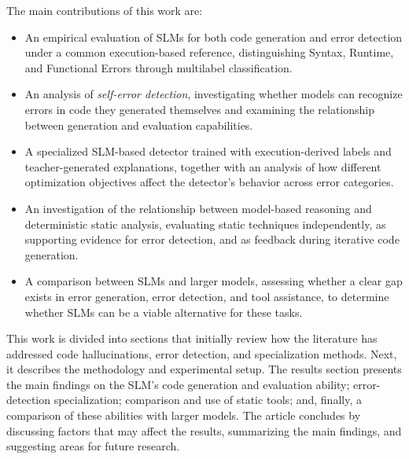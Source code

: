 The main contributions of this work are:

\begin{itemize}

    \item An empirical evaluation of SLMs for both code generation and error detection under a common execution-based reference, distinguishing Syntax, Runtime, and Functional Errors through multilabel classification.

    \item An analysis of \emph{self-error detection}, investigating whether models can recognize errors in code they generated themselves and examining the relationship between generation and evaluation capabilities.

    \item A specialized SLM-based detector trained with execution-derived labels and teacher-generated explanations, together with an analysis of how different optimization objectives affect the detector's behavior across error categories.

    \item An investigation of the relationship between model-based reasoning and deterministic static analysis, evaluating static techniques independently, as supporting evidence for error detection, and as feedback during iterative code generation.

    \item A comparison between SLMs and larger models, assessing whether a clear gap exists in error generation, error detection, and tool assistance, to determine whether SLMs can be a viable alternative for these tasks.

\end{itemize}

This work is divided into sections that initially review how the literature has addressed code hallucinations, error detection, and specialization methods. Next, it describes the methodology and experimental setup. The results section presents the main findings on the SLM's code generation and evaluation ability; error-detection specialization; comparison and use of static tools; and, finally, a comparison of these abilities with larger models. The article concludes by discussing factors that may affect the results, summarizing the main findings, and suggesting areas for future research.
